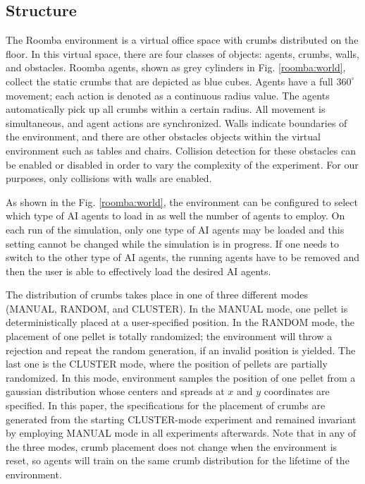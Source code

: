 \documentclass[conference]{IEEEtran}
\begin{document}
\subsection{Structure}
The Roomba environment is a virtual office space with crumbs distributed on
the floor.
In this virtual space, there are four classes of objects: agents, crumbs, walls,
and obstacles. 
Roomba agents, shown as grey cylinders in Fig. \ref{roomba:world}, collect the static crumbs that are depicted as blue cubes.  
Agents have a full $360^\circ$ movement; each action is
denoted as a continuous radius value. The
agents automatically pick up all crumbs within a certain radius.
All movement is simultaneous, and agent actions are synchronized.  
Walls indicate boundaries of the environment, and there are other obstacles objects within the virtual environment such as tables and chairs. Collision detection for these obstacles can be enabled or disabled in order to vary the complexity of the experiment. For our purposes, only collisions with walls are enabled.

As shown in the Fig. \ref{roomba:world}, the environment can be configured to select which type of AI agents to load in as well the
number of agents to employ. On each run of the
simulation, only one type of AI agents may be loaded and this setting cannot be changed while the simulation is in progress. 
If one needs to switch to the other type of AI agents, the running agents have
to be removed and then the user is able to effectively load the desired AI agents.

The distribution of crumbs takes place in one of three different modes (MANUAL, RANDOM, and CLUSTER).
In the MANUAL mode, one pellet is deterministically placed at a user-specified
position. 
In the RANDOM mode, the placement of one pellet is totally randomized; the
environment will throw a rejection and repeat the random generation, if an
invalid position is yielded. The last one is the CLUSTER mode, where the
position of pellets are partially randomized. In this mode,
environment samples the position of one pellet from a gaussian distribution
whose centers and spreads at $x$ and $y$ coordinates are specified. 
In this paper, the specifications for the placement of crumbs are generated
from the starting CLUSTER-mode experiment and remained invariant by
employing MANUAL mode in all experiments afterwards.
Note that in any of the three modes, crumb placement does not change when the environment is reset, so agents will train on the same crumb distribution for the lifetime of the environment.
\end{document}
